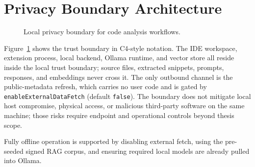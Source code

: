 \section{Privacy Boundary Architecture}

\begin{figure}[H]
  \centering
  \caption{Local privacy boundary for code analysis workflows.}
  \label{fig:privacy-boundary}
\end{figure}

Figure~\ref{fig:privacy-boundary} shows the trust boundary in C4-style notation. The IDE workspace, extension process, local backend, Ollama runtime, and vector store all reside inside the local trust boundary; source files, extracted snippets, prompts, responses, and embeddings never cross it. The only outbound channel is the public-metadata refresh, which carries no user code and is gated by \texttt{enableExternalDataFetch} (default \texttt{false}). The boundary does not mitigate local host compromise, physical access, or malicious third-party software on the same machine; those risks require endpoint and operational controls beyond thesis scope.

Fully offline operation is supported by disabling external fetch, using the pre-seeded signed RAG corpus, and ensuring required local models are already pulled into Ollama.
